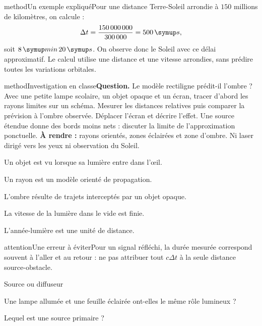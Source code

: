 \begin{pcEncadre}{method}{Un exemple expliqué}Pour une distance Terre-Soleil arrondie à $150$ millions de kilomètres, on calcule : \[\Delta t=\dfrac{150\,000\,000}{300\,000}=500\unite s,\] soit $8\unite{min}\,20\unite s$. On observe donc le Soleil avec ce délai approximatif. Le calcul utilise une distance et une vitesse arrondies, sans prédire toutes les variations orbitales.\end{pcEncadre}
\label{activite-16}
\begin{pcEncadre}{method}{Investigation en classe}\textbf{Question.} Le modèle rectiligne prédit-il l’ombre ? Avec une petite lampe scolaire, un objet opaque et un écran, tracer d’abord les rayons limites sur un schéma. Mesurer les distances relatives puis comparer la prévision à l’ombre observée. Déplacer l’écran et décrire l’effet. Une source étendue donne des bords moins nets : discuter la limite de l’approximation ponctuelle. \textbf{À rendre :} rayons orientés, zones éclairées et zone d’ombre. Ni laser dirigé vers les yeux ni observation du Soleil.\end{pcEncadre}
\begin{questions}
\item Un objet est vu lorsque sa lumière entre dans l’œil.
\item Un rayon est un modèle orienté de propagation.
\item L’ombre résulte de trajets interceptés par un objet opaque.
\item La vitesse de la lumière dans le vide est finie.
\item L’année-lumière est une unité de distance.
\end{questions}
\begin{pcEncadre}{attention}{Une erreur à éviter}Pour un signal réfléchi, la durée mesurée correspond souvent à l’aller et au retour : ne pas attribuer tout $c\Delta t$ à la seule distance source-obstacle.\end{pcEncadre}
\pcGrille
\clearpage{}
\par\noindent\begin{minipage}{\linewidth}
\begin{exercice}[1]{Source ou diffuseur}
\begin{questions}
\item Une lampe allumée et une feuille éclairée ont-elles le même rôle lumineux ?
\item Lequel est une source primaire ?
\end{questions}
\end{exercice}
\end{minipage}
